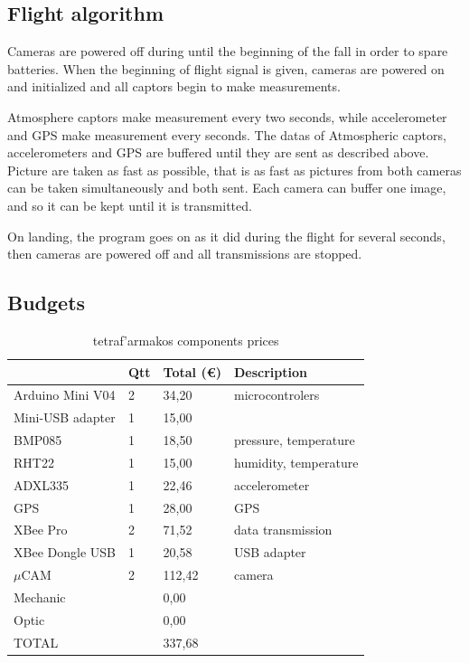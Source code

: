 \documentclass[twocolumn,10pt]{article}
\newcommand\tet{\textgreek{tetraf'armakos} }
\begin{document}
    \subsection{Flight algorithm}
    \par Cameras are powered off during until the beginning of the fall in order to spare batteries. When the beginning of flight signal is given, cameras are powered on and initialized and all captors begin to make measurements. 
    \par Atmosphere captors make measurement every two seconds, while accelerometer and GPS make measurement every seconds. The datas of Atmospheric captors, accelerometers and GPS are buffered until they are sent as described above. Picture are taken as fast as possible, that is as fast as pictures from both cameras can be taken simultaneously and both sent. Each camera can buffer one image, and so it can be kept until it is transmitted.
    \par On landing, the program goes on as it did during the flight for several seconds, then cameras are powered off and all transmissions are stopped.
    
    \subsection{Budgets}
    \begin{table}[!h]
    \centering
\begin{tabular}{||l|l|l|l||}
\hline
& Qtt & Total (\euro) & Description \\ \hline
Arduino Mini V04 & 2 & 34,20 & microcontrolers \\ \hline
Mini-USB adapter & 1 & 15,00 &  \\ \hline
BMP085 & 1 & 18,50 & pressure, temperature\\ \hline
RHT22 & 1 & 15,00 & humidity, temperature\\ \hline
ADXL335 & 1 & 22,46 & accelerometer\\ \hline
GPS & 1 & 28,00 & GPS\\ \hline
XBee Pro & 2 & 71,52 & data transmission\\ \hline
XBee Dongle USB & 1 & 20,58 & USB adapter\\ \hline
$\mu$CAM & 2 & 112,42 & camera\\ \hline
Mechanic &  & 0,00 & \\ \hline
Optic &  & 0,00 & \\ \hline \hline
TOTAL &  & 337,68 & \\ \hline
\end{tabular}
    \caption{\tet components prices}
\end{table}
\end{document}
